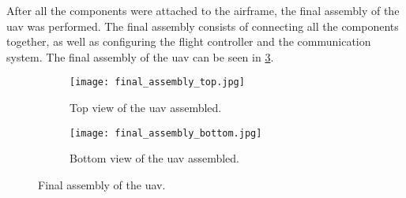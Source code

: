 After all the components were attached to the airframe, the final assembly of the \gls{uav} was performed. The final assembly consists of connecting all the components together, as well as configuring the flight controller and the communication system. The final assembly of the \gls{uav} can be seen in \cref{fig:uav_assembled}.

\begin{figure}
  \hfill
  \begin{subfigure}[t]{0.4\linewidth}
    \texttt{[image: final\_assembly\_top.jpg]}
    \caption{Top view of the \gls{uav} assembled.}\label{fig:uav_assembled_top}
  \end{subfigure}
  \hfill
  \begin{subfigure}[t]{0.4\linewidth}
    \texttt{[image: final\_assembly\_bottom.jpg]}
    \caption{Bottom view of the \gls{uav} assembled.}\label{fig:uav_assembled_bottom}
  \end{subfigure}
  \hfill

  \caption{Final assembly of the \gls{uav}.}\label{fig:uav_assembled}
\end{figure}

